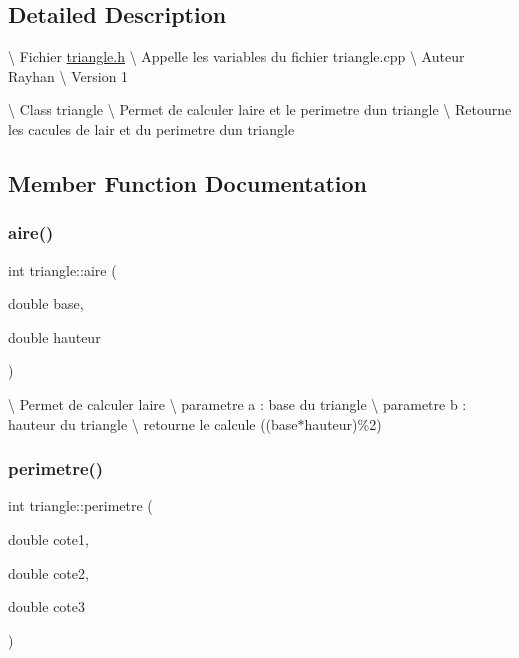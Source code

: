 \subsection{Detailed Description}
\textbackslash{} Fichier \hyperlink{triangle_8h_source}{triangle.\+h} \textbackslash{} Appelle les variables du fichier triangle.\+cpp \textbackslash{} Auteur Rayhan \textbackslash{} Version 1

\textbackslash{} Class triangle \textbackslash{} Permet de calculer l\textquotesingle{}aire et le perimetre d\textquotesingle{}un triangle \textbackslash{} Retourne les cacules de l\textquotesingle{}air et du perimetre d\textquotesingle{}un triangle 

\subsection{Member Function Documentation}
\mbox{\label{classtriangle_a8683b3301b318f00d2a097541d81c8a7}} 
\subsubsection{\texorpdfstring{aire()}{aire()}}
{\footnotesize\ttfamily int triangle\+::aire (\begin{DoxyParamCaption}\item[{double}]{base,  }\item[{double}]{hauteur }\end{DoxyParamCaption})}

\textbackslash{} Permet de calculer l\textquotesingle{}aire \textbackslash{} parametre a \+: base du triangle \textbackslash{} parametre b \+: hauteur du triangle \textbackslash{} retourne le calcule ((base$\ast$hauteur)\%2) \mbox{\label{classtriangle_a82bfb1d9a931d224519e5970f0dc438f}} 
\subsubsection{\texorpdfstring{perimetre()}{perimetre()}}
{\footnotesize\ttfamily int triangle\+::perimetre (\begin{DoxyParamCaption}\item[{double}]{cote1,  }\item[{double}]{cote2,  }\item[{double}]{cote3 }\end{DoxyParamCaption})}

